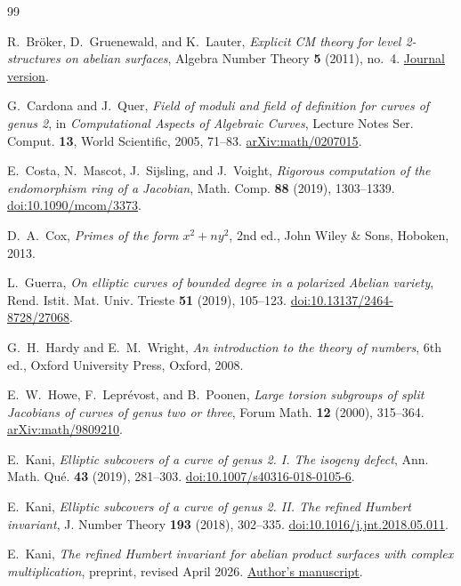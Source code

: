 \documentclass[11pt,letterpaper]{amsart}
\theoremstyle{definition}
\numberwithin{equation}{section}
\begin{document}
\begin{thebibliography}{99}
\raggedright
{}
R.~Br\"oker, D.~Gruenewald, and K.~Lauter,
\emph{Explicit CM theory for level 2-structures on abelian surfaces},
Algebra Number Theory \textbf{5} (2011), no.~4.
\href{https://msp.org/ant/2011/5-4/ant-v5-n4-s.pdf}{Journal version}.

G.~Cardona and J.~Quer,
\emph{Field of moduli and field of definition for curves of genus 2},
in \emph{Computational Aspects of Algebraic Curves}, Lecture Notes Ser.
Comput. \textbf{13}, World Scientific, 2005, 71--83.
\href{https://arxiv.org/abs/math/0207015}{arXiv:math/0207015}.

E.~Costa, N.~Mascot, J.~Sijsling, and J.~Voight,
\emph{Rigorous computation of the endomorphism ring of a Jacobian},
Math. Comp. \textbf{88} (2019), 1303--1339.
\href{https://doi.org/10.1090/mcom/3373}{doi:10.1090/mcom/3373}.

D.~A.~Cox, \emph{Primes of the form \(x^2+ny^2\)}, 2nd ed.,
John Wiley \& Sons, Hoboken, 2013.

L.~Guerra, \emph{On elliptic curves of bounded degree in a polarized
Abelian variety}, Rend. Istit. Mat. Univ. Trieste \textbf{51}
(2019), 105--123.
\href{https://doi.org/10.13137/2464-8728/27068}{doi:10.13137/2464-8728/27068}.

G.~H.~Hardy and E.~M.~Wright,
\emph{An introduction to the theory of numbers}, 6th ed.,
Oxford University Press, Oxford, 2008.

E.~W.~Howe, F.~Lepr\'evost, and B.~Poonen,
\emph{Large torsion subgroups of split Jacobians of curves of genus
two or three}, Forum Math. \textbf{12} (2000), 315--364.
\href{https://arxiv.org/abs/math/9809210}{arXiv:math/9809210}.

E.~Kani, \emph{Elliptic subcovers of a curve of genus 2.
I. The isogeny defect}, Ann. Math. Qu\'e. \textbf{43} (2019), 281--303.
\href{https://doi.org/10.1007/s40316-018-0105-6}{doi:10.1007/s40316-018-0105-6}.

E.~Kani, \emph{Elliptic subcovers of a curve of genus 2.
II. The refined Humbert invariant},
J. Number Theory \textbf{193} (2018), 302--335.
\href{https://doi.org/10.1016/j.jnt.2018.05.011}{doi:10.1016/j.jnt.2018.05.011}.

E.~Kani, \emph{The refined Humbert invariant for abelian product
surfaces with complex multiplication}, preprint, revised April 2026.
\href{https://www.queensu.ca/academia/kani/sites/acadkaniwww/files/uploaded_files/Preprints/refHum5.pdf}{Author's manuscript}.


\end{thebibliography}
\end{document}
